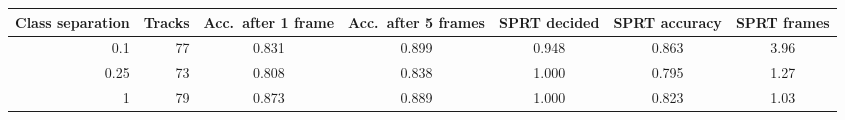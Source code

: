 \begin{tabular}{rrccccc}\toprule
Class separation & Tracks & Acc.\ after 1 frame & Acc.\ after 5 frames & SPRT decided & SPRT accuracy & SPRT frames \\\midrule
0.1 & 77 & 0.831 & 0.899 & 0.948 & 0.863 & 3.96 \\
0.25 & 73 & 0.808 & 0.838 & 1.000 & 0.795 & 1.27 \\
1 & 79 & 0.873 & 0.889 & 1.000 & 0.823 & 1.03 \\
\bottomrule\end{tabular}
